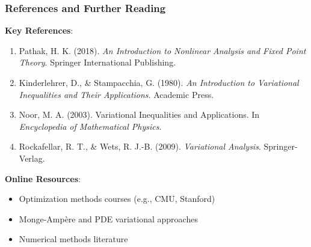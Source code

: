 \documentclass[aspectratio=169,10pt]{beamer}
\begin{document}
\begin{frame}
\frametitle{References and Further Reading}

\vspace{0.3cm}

\textbf{Key References}:

\begin{enumerate}
    \item Pathak, H. K. (2018). \textit{An Introduction to Nonlinear Analysis and Fixed Point Theory}.
    Springer International Publishing.

    \item Kinderlehrer, D., \& Stampacchia, G. (1980). \textit{An Introduction to Variational Inequalities
    and Their Applications}. Academic Press.

    \item Noor, M. A. (2003). Variational Inequalities and Applications.
    In \textit{Encyclopedia of Mathematical Physics}.

    \item Rockafellar, R. T., \& Wets, R. J.-B. (2009). \textit{Variational Analysis}.
    Springer-Verlag.
\end{enumerate}

\vspace{0.3cm}

\textbf{Online Resources}:
\begin{itemize}
    \item Optimization methods courses (e.g., CMU, Stanford)
    \item Monge-Ampère and PDE variational approaches
    \item Numerical methods literature
\end{itemize}

\end{frame}
\end{document}
